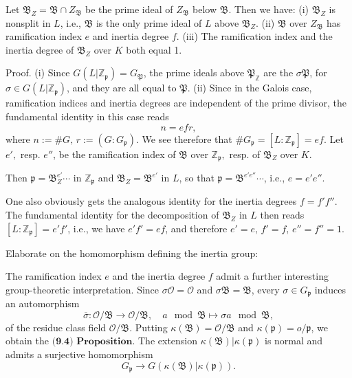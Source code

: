Let \( \mathfrak{B}_Z = \mathfrak{B} \cap Z_\mathfrak{B} \) be the prime ideal of \( Z_\mathfrak{B} \) below \( \mathfrak{B} \).
Then we have:
(i) \( \mathfrak{B}_Z \) is nonsplit in \( L \), i.e., \( \mathfrak{B} \) is the only prime ideal of \( L \) above \( \mathfrak{B}_Z \).
(ii) \( \mathfrak{B} \) over \( Z_\mathfrak{B} \) has ramification index \( e \) and inertia degree \( f \).
(iii) The ramification index and the inertia degree of \( \mathfrak{B}_Z \) over \( K \) both equal 1.

Proof.
(i) 
Since \( G(L | \mathbb{Z}_{\mathfrak{p}}) = G_{\mathfrak{P}} \), the prime ideals above \(\mathfrak{P}_{\mathbb{Z}}\) 
are the \(\sigma \mathfrak{P}\), for \(\sigma \in G(L | \mathbb{Z}_{\mathfrak{p}})\), and they are all equal to \(\mathfrak{P}\).
(ii) 
Since in the Galois case, ramification indices and inertia degrees are independent of the prime divisor, 
the fundamental identity in this case reads
\[
n = efr,
\]
where \( n := \# G, \, r := (G : G_{\mathfrak{p}}) \). 
We see therefore that \( \# G_{\mathfrak{p}} = [L : \mathbb{Z}_{\mathfrak{p}}] = ef \). 
Let \( e', \) resp. \( e'' \), be the ramification index of \(\mathfrak{B}\) over 
\(\mathbb{Z}_{\mathfrak{p}},\) resp. of \(\mathfrak{B}_Z\) over \(K\).

Then \(\mathfrak{p} = \mathfrak{B}^{e'}_Z \cdots \) in \( \mathbb{Z}_{\mathfrak{p}} \) and \(\mathfrak{B}_Z = \mathfrak{B}^{e'} \) in \( L \), 
so that \(\mathfrak{p} = \mathfrak{B}^{e' e''} \cdots\), i.e., \( e = e' e'' \). 

One also obviously gets the analogous identity for the inertia degrees \( f = f' f'' \). 
The fundamental identity for the decomposition of \(\mathfrak{B}_Z\) in \(L\) then reads 
\([L : \mathbb{Z}_{\mathfrak{p}}] = e' f'\), i.e., we have \( e' f' = ef\), and therefore \( e' = e, \, f' = f, \, e'' = f'' = 1 \).


Elaborate on the homomorphism defining the inertia group:

The ramification index \( e \) and the inertia degree \( f \) admit a further interesting group-theoretic interpretation. 
Since \( \sigma \mathcal{O} = \mathcal{O} \) and \( \sigma \mathfrak{B} = \mathfrak{B} \), 
every \( \sigma \in G_{\mathfrak{p}} \) induces an automorphism
\[
\overline{\sigma} : \mathcal{O}/\mathfrak{B} \longrightarrow \mathcal{O}/\mathfrak{B}, \quad a \mod \mathfrak{B} \mapsto \sigma a \mod \mathfrak{B},
\]
of the residue class field \(\mathcal{O}/\mathfrak{B}\). 
Putting \(\kappa(\mathfrak{B}) = \mathcal{O}/\mathfrak{B}\) and \(\kappa(\mathfrak{p}) = o/\mathfrak{p}\), we obtain the
\( \textbf{(9.4) Proposition.} \)
The extension \(\kappa(\mathfrak{B})|\kappa(\mathfrak{p})\) is normal and admits a surjective homomorphism
\[
G_{\mathfrak{p}} \longrightarrow G(\kappa(\mathfrak{B})|\kappa(\mathfrak{p})).
\]


